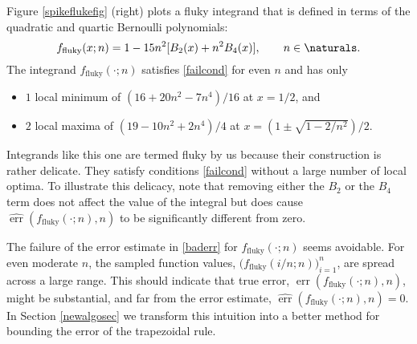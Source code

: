 \documentclass[]{amsart}
\DeclareMathOperator{\err}{err}
\newcommand{\herr}{\widehat{\err}}
\theoremstyle{definition}
\theoremstyle{remark}
\begin{document}
Figure \ref{spikeflukefig} (right) plots a fluky integrand that is defined in terms of the quadratic and quartic Bernoulli polynomials:
\begin{equation} \label{fluky}
f_{\text{fluky}}(x;n) = 1 - 15 n^2 [B_2(x) + n^2 B_4(x)], \qquad n \in \naturals.
\end{equation}
The integrand $f_{\text{fluky}}(\cdot;n)$ satisfies \eqref{failcond} for even $n$ and has only 
\begin{itemize}
\item $1$ local minimum of $(16 + 20 n^2 - 7 n^4)/16$ at $x=1/2$, and
\item $2$ local maxima of $(19 - 10 n^2 + 2 n^4)/4$ at $x=(1 \pm \sqrt{1 -2/n^2})/2$.
\end{itemize}
Integrands like this one are termed fluky by us because their construction is rather delicate.  They satisfy conditions \eqref{failcond} without a large number of local optima.  To illustrate this delicacy, note that removing either the $B_2$ or the $B_4$ term does not affect the value of the integral but does cause $\herr(f_{\text{fluky}}(\cdot;n),n)$ to be significantly different from zero.

The failure of the error estimate in \eqref{baderr} for $f_{\text{fluky}}(\cdot;n)$ seems avoidable. For even moderate $n$, the sampled function values, $\bigl(f_{\text{fluky}}(i/n;n)\bigr)_{i=1}^{n}$, are spread across a large range.  This should indicate that true error, $\err(f_{\text{fluky}}(\cdot;n),n)$, might be substantial, and far from the error estimate, $\herr(f_{\text{fluky}}(\cdot;n),n)=0$.  In Section \ref{newalgosec} we transform this intuition into a better method for bounding the error of the trapezoidal rule.
\end{document}
